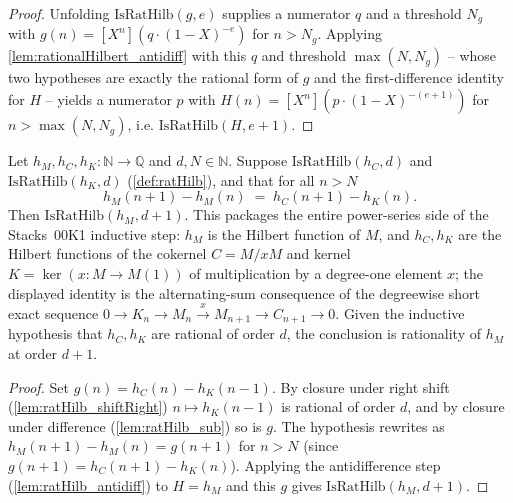 \begin{proof}
  \leanok
  Unfolding \(\mathrm{IsRatHilb}(g, e)\) supplies a numerator \(q\) and a
  threshold \(N_g\) with \(g(n) = [X^n](q\cdot(1-X)^{-e})\) for \(n > N_g\).
  Applying \cref{lem:rationalHilbert_antidiff} with this \(q\) and threshold
  \(\max(N, N_g)\) -- whose two hypotheses are exactly the rational form of \(g\)
  and the first-difference identity for \(H\) -- yields a numerator \(p\) with
  \(H(n) = [X^n](p\cdot(1-X)^{-(e+1)})\) for \(n > \max(N, N_g)\), i.e.
  \(\mathrm{IsRatHilb}(H, e+1)\).
\end{proof}

\begin{lemma}\leanok
  \label{lem:ratHilb_ofDiffEq}
  Let \(h_M, h_C, h_K : \mathbb{N} \to \mathbb{Q}\) and \(d, N \in \mathbb{N}\).
  Suppose \(\mathrm{IsRatHilb}(h_C, d)\) and \(\mathrm{IsRatHilb}(h_K, d)\)
  (\cref{def:ratHilb}), and that for all \(n > N\)
  \[
    h_M(n+1) - h_M(n) \;=\; h_C(n+1) - h_K(n).
  \]
  Then \(\mathrm{IsRatHilb}(h_M, d+1)\). This packages the entire power-series
  side of the Stacks~00K1 inductive step: \(h_M\) is the Hilbert function of
  \(M\), and \(h_C, h_K\) are the Hilbert functions of the cokernel
  \(C = M/xM\) and kernel \(K = \ker(x : M \to M(1))\) of multiplication by a
  degree-one element \(x\); the displayed identity is the alternating-sum
  consequence of the degreewise short exact sequence
  \(0 \to K_n \to M_n \xrightarrow{x} M_{n+1} \to C_{n+1} \to 0\). Given the
  inductive hypothesis that \(h_C, h_K\) are rational of order \(d\), the
  conclusion is rationality of \(h_M\) at order \(d+1\).
\end{lemma}

\begin{proof}
  \leanok
  Set \(g(n) = h_C(n) - h_K(n-1)\). By closure under right shift
  (\cref{lem:ratHilb_shiftRight}) \(n \mapsto h_K(n-1)\) is rational of order
  \(d\), and by closure under difference (\cref{lem:ratHilb_sub}) so is \(g\). The
  hypothesis rewrites as \(h_M(n+1) - h_M(n) = g(n+1)\) for \(n > N\) (since
  \(g(n+1) = h_C(n+1) - h_K(n)\)). Applying the antidifference step
  (\cref{lem:ratHilb_antidiff}) to \(H = h_M\) and this \(g\) gives
  \(\mathrm{IsRatHilb}(h_M, d+1)\).
\end{proof}

